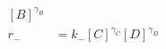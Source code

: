 \begin{eqnarray}\label{
r_+  & =  k_+[A]^{\gamma_A}[B]^{\gamma_B} \\
r_-  & =  k_-[C]^{\gamma_C}[D]^{\gamma_D} \\
\end{eqnarray}